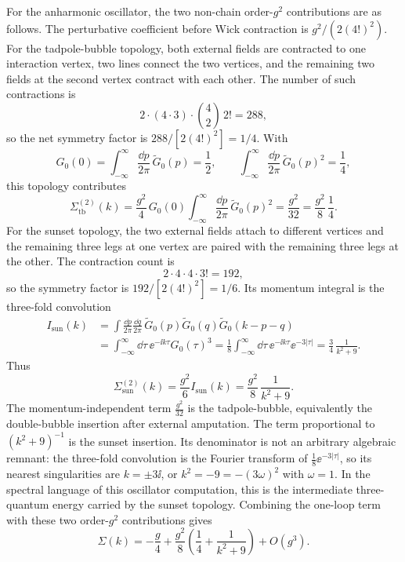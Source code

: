 For the anharmonic oscillator, the two non-chain order-\(g^2\) contributions
are as follows.  The perturbative coefficient before Wick contraction is
\(g^2/(2(4!)^2)\).  For the tadpole-bubble topology, both external fields are
contracted to one interaction vertex, two lines connect the two vertices, and
the remaining two fields at the second vertex contract with each other.  The
number of such contractions is
\[
  2\cdot (4\cdot3)\cdot\binom42\,2! = 288,
\]
so the net symmetry factor is \(288/[2(4!)^2]=1/4\).  With
\[
  G_0(0)
  =
  \int_{-\infty}^{\infty}\frac{\dd p}{2\pi}\,\widetilde G_0(p)
  =
  \frac12,
  \qquad
  \int_{-\infty}^{\infty}\frac{\dd p}{2\pi}\,\widetilde G_0(p)^2
  =
  \frac14,
\]
this topology contributes
\[
  \Sigma_{\mathrm{tb}}^{(2)}(k)
  =
  \frac{g^2}{4}\,G_0(0)
  \int_{-\infty}^{\infty}\frac{\dd p}{2\pi}\,\widetilde G_0(p)^2
  =
  \frac{g^2}{32}
  =
  \frac{g^2}{8}\,\frac14 .
\]
For the sunset topology, the two external fields attach to different vertices
and the remaining three legs at one vertex are paired with the remaining three
legs at the other.  The contraction count is
\[
  2\cdot4\cdot4\cdot3! = 192,
\]
so the symmetry factor is \(192/[2(4!)^2]=1/6\).  Its momentum integral is the
three-fold convolution
\[
\begin{aligned}
  I_{\mathrm{sun}}(k)
  &=
  \int\frac{\dd p}{2\pi}\frac{\dd q}{2\pi}\,
  \widetilde G_0(p)\widetilde G_0(q)\widetilde G_0(k-p-q)  \\
  &=
  \int_{-\infty}^{\infty}\dd\tau\,\ee^{-\ii k\tau}G_0(\tau)^3
  =
  \frac18
  \int_{-\infty}^{\infty}\dd\tau\,\ee^{-\ii k\tau}\ee^{-3|\tau|}
  =
  \frac{3}{4}\,\frac{1}{k^2+9}.
\end{aligned}
\]
Thus
\[
  \Sigma_{\mathrm{sun}}^{(2)}(k)
  =
  \frac{g^2}{6}I_{\mathrm{sun}}(k)
  =
  \frac{g^2}{8}\,\frac{1}{k^2+9}.
\]
The momentum-independent term \(\frac{g^2}{32}\) is the
tadpole-bubble, equivalently the double-bubble insertion after external
amputation.  The term proportional to \((k^2+9)^{-1}\) is the sunset
insertion.  Its denominator is not an arbitrary algebraic remnant: the
three-fold convolution is the Fourier transform of
\(\frac18\ee^{-3|\tau|}\), so its nearest singularities are
\(k=\pm3\ii\), or \(k^2=-9=-(3\omega)^2\) with \(\omega=1\).  In the spectral
language of this oscillator computation, this is the intermediate
three-quantum energy carried by the sunset topology.
Combining the one-loop term with these two order-\(g^2\) contributions gives
\[
  \Sigma(k)
  =
  -\frac{g}{4}
  +
  \frac{g^2}{8}
  \left(
    \frac14+\frac{1}{k^2+9}
  \right)
  +O(g^3).
\]
